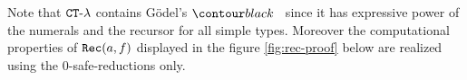 \begin{example}
Note that ${ {\tt CT}\mbox{-}\lambda}$ contains G\"{o}del's $\systemT$ since it has expressive power of the numerals and the recursor for all simple types. 
Moreover the computational properties of ${\tt Rec}(a,f)$ displayed in the figure \ref{fig:rec-proof} 
below are realized using the $0$-safe-reductions only. 
\end{example}  



